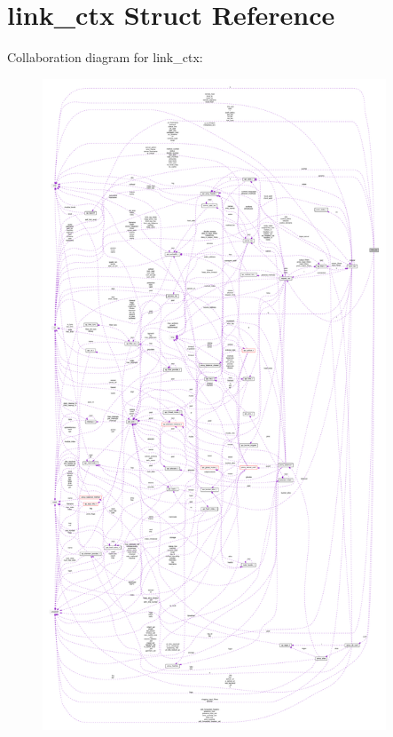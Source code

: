 \hypertarget{structlink__ctx}{}\section{link\+\_\+ctx Struct Reference}
\label{structlink__ctx}


Collaboration diagram for link\+\_\+ctx\+:
\nopagebreak
\begin{figure}[H]
\begin{center}
\leavevmode
\includegraphics[height=550pt]{structlink__ctx__coll__graph}
\end{center}
\end{figure}
